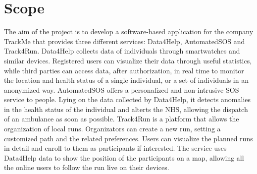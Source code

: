 \section{Scope}
The aim of the project is to develop a software-based application for the company TrackMe that
provides three different services: Data4Help, AutomatedSOS and Track4Run.
Data4Help collects data of individuals through smartwatches and similar devices. Registered users can
visualize their data through useful statistics, while third parties can access data, after authorization,
in real time to monitor the location and health status of a single individual, or a set of individuals in an
anonymized way.
AutomatedSOS offers a personalized and non-intrusive SOS service to  people. Lying on the
data collected by Data4Help, it detects anomalies in the health status of the individual and alterts the NHS, allowing the dispatch of an ambulance as soon as possible.
Track4Run is a platform that allows the organization of local runs. Organizators can create a new run, setting a customized path and the related preferences. Users can visualize the planned runs in detail and enroll to them as participants if interested. The
service uses Data4Help data to show the position of the participants on a map, allowing all the online users to follow the run live on their devices.